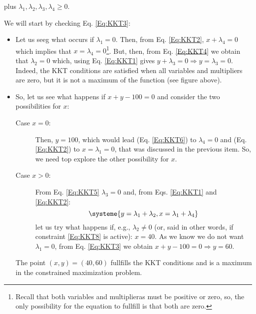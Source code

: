 \begin{itemize}
  plus $\lambda_1,\lambda_2,\lambda_3,\lambda_4\geq 0$.

  We will start by checking Eq. \ref{Eq:KKT3}:
  \begin{itemize}
    \item  Let us seeg what occurs if $\lambda_1=0$. Then, from Eq. \ref{Eq:KKT2}, $x+\lambda_4=0$ which implies that $x=\lambda_4=0$\footnote{Recall that both variables and multiplieras must be positive or zero, so, the only possibility for the equation to fullfill is that both are zero.}. But, then, from Eq. \ref{Eq:KKT4} we obtain that $\lambda_2=0$ which, using Eq. \ref{Eq:KKT1} gives $y+\lambda_3=0\Rightarrow y=\lambda_3=0$. Indeed, the KKT conditions are satisfied when all variables and multipliers are zero, but it is not a maximum of the function (see figure above).
    \item So, let us see what happens if $x+y-100=0$ and consider the two possibilities for $x$:
    \begin{description}
      \item[Case $x=0$:] Then, $y=100$, which would lead (Eq. \ref{Eq:KKT6}) to $\lambda_4=0$ and (Eq. \ref{Eq:KKT2}) to $x=\lambda_1=0$, that was discussed in the previous item. So, we need top explore the other possibility for $x$.
      \item[Case $x>0$:] From Eq. \ref{Eq:KKT5} $\lambda_3=0$ and, from Eqs. \ref{Eq:KKT1} and \ref{Eq:KKT2}:
      \[\systeme{y=\lambda_1+\lambda_2,x=\lambda_1+\lambda_4}
      \] 
      let us try what happens if, e.g., $\lambda_2\neq 0$ (or, said in other words, if constraint \ref{Eq:KKT8} is active): $x=40$. As we know we do not want $\lambda_1=0$, from Eq. \ref{Eq:KKT3} we obtain $x+y-100=0\Rightarrow y=60$.
    \end{description}

    The point $(x,y)=(40,60)$ fullfills the KKT conditions and is a maximum in the constrained maximization problem.

 \end{itemize}
\end{itemize}